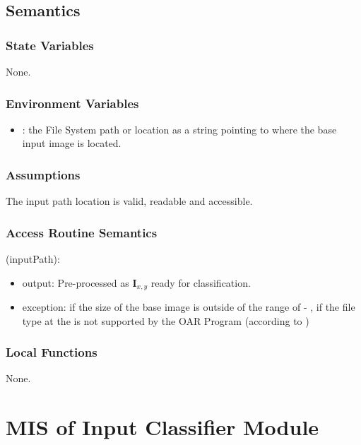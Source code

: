 \documentclass[12pt, titlepage]{article}
\begin{document}
\subsection{Semantics}

\subsubsection{State Variables}

None.

\subsubsection{Environment Variables}

\begin{itemize}
  \item {}: the File System path or location as a string pointing to where the base input image is located.
\end{itemize}

\subsubsection{Assumptions}

The input path location is valid, readable and accessible.

\subsubsection{Access Routine Semantics}

\noindent {}(inputPath):
\begin{itemize}
\item output: Pre-processed  as $\mathbf{I}_{x,y}$ ready for classification.
\item exception:  if the size of the base image is outside of the range of 
 - ,  if the file type at the  is not 
supported by the OAR Program (according to )
\end{itemize}

\subsubsection{Local Functions}

None.


\section{MIS of Input Classifier Module} \label{ModuleIC} 
\end{document}

